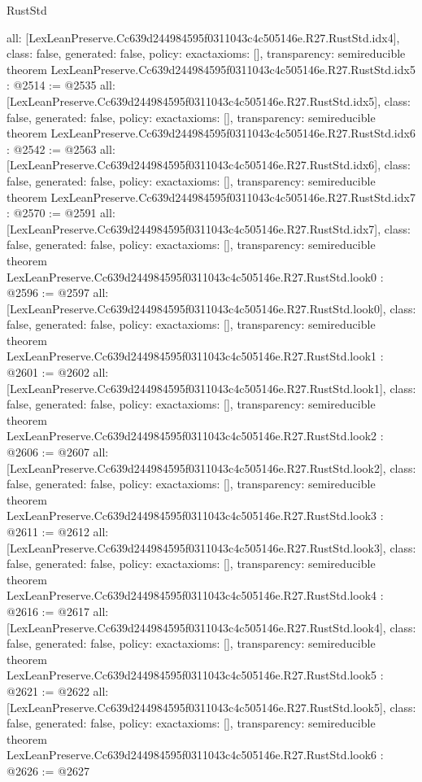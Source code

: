 \begin{lexlean}{RustStd}
\begin{coremodule}
{  all: [LexLeanPreserve.Cc639d244984595f0311043c4c505146e.R27.RustStd.idx4],
  class: false,
  generated: false,
  policy: exact{axioms: []},
  transparency: semireducible
}
theorem LexLeanPreserve.Cc639d244984595f0311043c4c505146e.R27.RustStd.idx5 : @2514 := @2535 {
  all: [LexLeanPreserve.Cc639d244984595f0311043c4c505146e.R27.RustStd.idx5],
  class: false,
  generated: false,
  policy: exact{axioms: []},
  transparency: semireducible
}
theorem LexLeanPreserve.Cc639d244984595f0311043c4c505146e.R27.RustStd.idx6 : @2542 := @2563 {
  all: [LexLeanPreserve.Cc639d244984595f0311043c4c505146e.R27.RustStd.idx6],
  class: false,
  generated: false,
  policy: exact{axioms: []},
  transparency: semireducible
}
theorem LexLeanPreserve.Cc639d244984595f0311043c4c505146e.R27.RustStd.idx7 : @2570 := @2591 {
  all: [LexLeanPreserve.Cc639d244984595f0311043c4c505146e.R27.RustStd.idx7],
  class: false,
  generated: false,
  policy: exact{axioms: []},
  transparency: semireducible
}
theorem LexLeanPreserve.Cc639d244984595f0311043c4c505146e.R27.RustStd.look0 : @2596 := @2597 {
  all: [LexLeanPreserve.Cc639d244984595f0311043c4c505146e.R27.RustStd.look0],
  class: false,
  generated: false,
  policy: exact{axioms: []},
  transparency: semireducible
}
theorem LexLeanPreserve.Cc639d244984595f0311043c4c505146e.R27.RustStd.look1 : @2601 := @2602 {
  all: [LexLeanPreserve.Cc639d244984595f0311043c4c505146e.R27.RustStd.look1],
  class: false,
  generated: false,
  policy: exact{axioms: []},
  transparency: semireducible
}
theorem LexLeanPreserve.Cc639d244984595f0311043c4c505146e.R27.RustStd.look2 : @2606 := @2607 {
  all: [LexLeanPreserve.Cc639d244984595f0311043c4c505146e.R27.RustStd.look2],
  class: false,
  generated: false,
  policy: exact{axioms: []},
  transparency: semireducible
}
theorem LexLeanPreserve.Cc639d244984595f0311043c4c505146e.R27.RustStd.look3 : @2611 := @2612 {
  all: [LexLeanPreserve.Cc639d244984595f0311043c4c505146e.R27.RustStd.look3],
  class: false,
  generated: false,
  policy: exact{axioms: []},
  transparency: semireducible
}
theorem LexLeanPreserve.Cc639d244984595f0311043c4c505146e.R27.RustStd.look4 : @2616 := @2617 {
  all: [LexLeanPreserve.Cc639d244984595f0311043c4c505146e.R27.RustStd.look4],
  class: false,
  generated: false,
  policy: exact{axioms: []},
  transparency: semireducible
}
theorem LexLeanPreserve.Cc639d244984595f0311043c4c505146e.R27.RustStd.look5 : @2621 := @2622 {
  all: [LexLeanPreserve.Cc639d244984595f0311043c4c505146e.R27.RustStd.look5],
  class: false,
  generated: false,
  policy: exact{axioms: []},
  transparency: semireducible
}
theorem LexLeanPreserve.Cc639d244984595f0311043c4c505146e.R27.RustStd.look6 : @2626 := @2627 {
}
\end{coremodule}
\end{lexlean}
